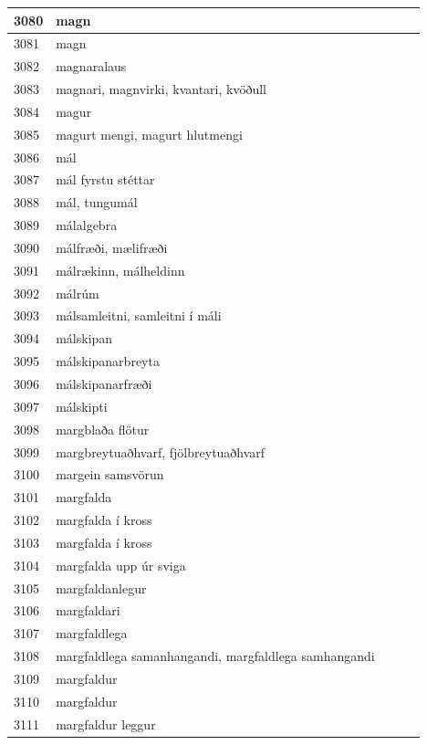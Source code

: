 \begin{longtable}{p{}|p{}|p{}|p{}|p{}}
\hline
3080 & magn &  &  &  \\
\hline
3081 & magn &  &  &  \\
\hline
3082 & magnaralaus &  &  &  \\
\hline
3083 & magnari, magnvirki, kvantari, kvöðull &  &  &  \\
\hline
3084 & magur &  &  &  \\
\hline
3085 & magurt mengi, magurt hlutmengi &  &  &  \\
\hline
3086 & mál &  &  &  \\
\hline
3087 & mál fyrstu stéttar &  &  &  \\
\hline
3088 & mál, tungumál &  &  &  \\
\hline
3089 & málalgebra &  &  &  \\
\hline
3090 & málfræði, mælifræði &  &  &  \\
\hline
3091 & málrækinn, málheldinn &  &  &  \\
\hline
3092 & málrúm &  &  &  \\
\hline
3093 & málsamleitni, samleitni í máli &  &  &  \\
\hline
3094 & málskipan &  &  &  \\
\hline
3095 & málskipanarbreyta &  &  &  \\
\hline
3096 & málskipanarfræði &  &  &  \\
\hline
3097 & málskipti &  &  &  \\
\hline
3098 & margblaða flötur &  &  &  \\
\hline
3099 & margbreytuaðhvarf, fjölbreytuaðhvarf &  &  &  \\
\hline
3100 & margein samsvörun &  &  &  \\
\hline
3101 & margfalda &  &  &  \\
\hline
3102 & margfalda í kross &  &  &  \\
\hline
3103 & margfalda í kross &  &  &  \\
\hline
3104 & margfalda upp úr sviga &  &  &  \\
\hline
3105 & margfaldanlegur &  &  &  \\
\hline
3106 & margfaldari &  &  &  \\
\hline
3107 & margfaldlega &  &  &  \\
\hline
3108 & margfaldlega samanhangandi, margfaldlega samhangandi &  &  &  \\
\hline
3109 & margfaldur &  &  &  \\
\hline
3110 & margfaldur &  &  &  \\
\hline
3111 & margfaldur leggur &  &  &  \\

\end{longtable}
